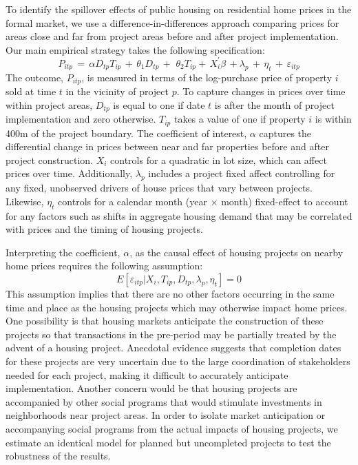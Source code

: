 \documentclass[12pt]{article}
\begin{document}
To identify the spillover effects of public housing on residential home prices in the formal market, we use a difference-in-differences approach comparing prices for areas close and far from project areas before and after project implementation.  Our main empirical strategy takes the following specification:
\begin{equation*}
P_{itp} \, = \, \alpha D_{tp}T_{ip} \, + \,\theta_1 D_{tp} \, + \, \,\theta_2 T_{ip}+ \, X^{'}_{i}\beta \, +  \lambda_p \,  + \, \eta_{t} \, + \, \varepsilon_{itp}
\end{equation*}
The outcome, $P_{itp}$, is measured in terms of the log-purchase price of property $i$ sold at time $t$ in the vicinity of project $p$.  To capture changes in prices over time within project areas, $D_{tp}$ is equal to one if date $t$ is after the month of project implementation and zero otherwise.  $T_{ip}$ takes a value of one if property $i$ is within 400m of the project boundary.  The coefficient of interest, $\alpha$ captures the differential change in prices between near and far properties before and after project construction.  $X_i$ controls for a quadratic in lot size, which can affect prices over time.  Additionally, $\lambda_p$ includes a project fixed affect controlling for any fixed, unobserved drivers of house prices that vary between projects.  Likewise, $\eta_{t}$ controls for a calendar month (year$\,\times\,$month) fixed-effect to account for any factors such as shifts in aggregate housing demand that may be correlated with prices and the timing of housing projects.

Interpreting the coefficient, $\alpha$, as the causal effect of housing projects on nearby home prices requires the following assumption:
\begin{equation*}
E[\varepsilon_{itp}|X_{i},T_{ip},D_{tp},\lambda_p,\eta_{t}]=0
\end{equation*}
This assumption implies that there are no other factors occurring in the same time and place as the housing projects which may otherwise impact home prices.  One possibility is that housing markets anticipate the construction of these projects so that transactions in the pre-period may be partially treated by the advent of a housing project.  Anecdotal evidence suggests that completion dates for these projects are very uncertain due to the large coordination of stakeholders needed for each project, making it difficult to accurately anticipate implementation.  Another concern would be that housing projects are accompanied by other social programs that would stimulate investments in neighborhoods near project areas.  In order to isolate market anticipation or accompanying social programs from the actual impacts of housing projects, we estimate an identical model for planned but uncompleted projects to test the robustness of the results.
\end{document}
